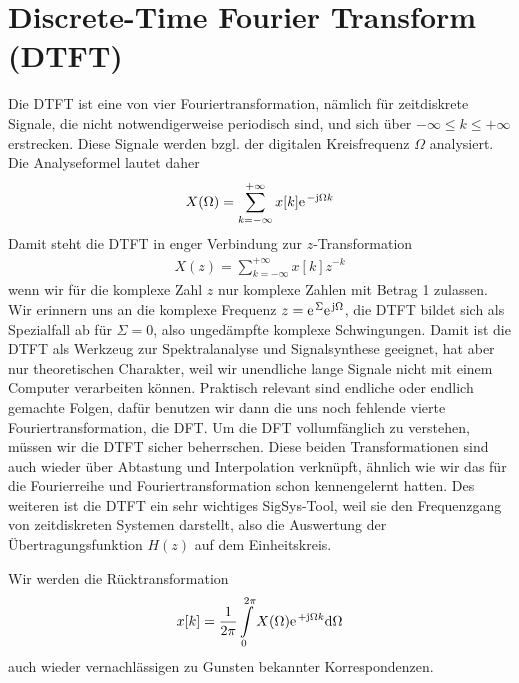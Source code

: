 \clearpage
\section{Discrete-Time Fourier Transform (DTFT)}

Die DTFT ist eine von vier Fouriertransformation, nämlich für
zeitdiskrete Signale, die nicht notwendigerweise periodisch sind, und sich über
$-\infty \leq k \leq +\infty$ erstrecken.
Diese Signale werden bzgl. der digitalen Kreisfrequenz $\Omega$ analysiert.
%
Die Analyseformel lautet daher
\begin{align}
X(\Omega) = \sum\limits_{k=-\infty}^{+\infty} x[k] \e^{-\im\Omega k}
\end{align}
%
Damit steht die DTFT in enger Verbindung zur $z$-Transformation
\begin{align}
X(z) = \sum\limits_{k=-\infty}^{+\infty} x[k] z^{-k}
\end{align}
wenn wir für die komplexe Zahl $z$ nur komplexe Zahlen mit Betrag 1 zulassen.
%
Wir erinnern uns an die komplexe Frequenz $z=\e^\Sigma \e^{\im\Omega}$, die DTFT
bildet sich als Spezialfall ab für $\Sigma=0$, also ungedämpfte komplexe Schwingungen.
%
Damit ist die DTFT als Werkzeug zur Spektralanalyse und Signalsynthese geeignet,
hat aber nur theoretischen Charakter, weil wir unendliche lange Signale
nicht mit einem Computer verarbeiten können. Praktisch relevant sind
endliche oder endlich gemachte Folgen, dafür benutzen wir dann die uns noch fehlende
vierte Fouriertransformation, die DFT.
Um die DFT vollumfänglich zu verstehen, müssen wir die DTFT sicher beherrschen.
Diese beiden Transformationen sind auch wieder über Abtastung und Interpolation
verknüpft, ähnlich wie wir das für die Fourierreihe und Fouriertransformation
schon kennengelernt hatten.
%
Des weiteren ist die DTFT ein sehr wichtiges SigSys-Tool, weil
sie den Frequenzgang von zeitdiskreten Systemen darstellt, also die Auswertung
der Übertragungsfunktion $H(z)$ auf dem Einheitskreis.
%

Wir werden die Rücktransformation
\begin{align}
x[k] = \frac{1}{2\pi} \int\limits_{0}^{2\pi} X(\Omega) \e^{+\im\Omega k} \fsd \Omega
\end{align}
auch wieder vernachlässigen zu Gunsten bekannter Korrespondenzen.

